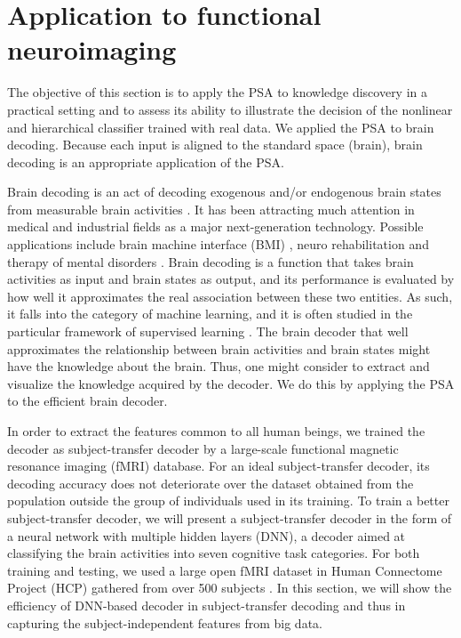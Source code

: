 \section{Application to functional neuroimaging}
\label{sec:application}

The objective of this section is to apply the PSA to knowledge discovery in
a practical setting and to assess its ability to
illustrate the decision of the nonlinear and hierarchical classifier trained with real data.
%
We applied the PSA to brain decoding.
%
Because each input is aligned to the standard space (brain),
brain decoding is an appropriate application of the PSA.

Brain decoding is an act of decoding exogenous and/or endogenous brain states from measurable brain activities \cite{haxby2001distributed,cox2003functional,kamitani2005decoding,shibata2011perceptual,Horikawa2013}.
%
It has been attracting much attention in medical and industrial fields as a major next-generation technology.
%
Possible applications include brain machine interface
(BMI) \cite{laconte2011decoding}, neuro
rehabilitation \cite{sitaram2012acquired} and therapy of mental
disorders \cite{sitaram2007fmri}.
Brain decoding is a function that takes brain activities as input and
brain states as output, and its performance is evaluated by how well it
approximates the real association between these two entities.
%
As such, it falls into the category of machine learning, and it is often
studied in the particular framework of supervised learning \cite{lemm2011introduction}.
%
The brain decoder that well approximates the relationship between brain
activities and brain states might have the knowledge about the brain.
%
Thus, one might consider to extract and visualize the knowledge acquired by the decoder.
%
We do this by applying the PSA to the efficient brain decoder.

In order to extract the features common to all human beings,
we trained the decoder as subject-transfer decoder \cite{fazli2009subject,raizada2012makes,marquand2014bayesian}
by a large-scale functional magnetic resonance imaging (fMRI) database.
%
For an ideal subject-transfer decoder, its decoding accuracy does not
deteriorate over the dataset obtained from the population outside the
group of individuals used in its training.
%
To train a better subject-transfer decoder, we will present a
subject-transfer decoder in the form of a neural network with multiple
hidden layers (DNN), a decoder aimed at classifying the brain activities
into seven cognitive task categories.
%
For both training and testing, we used a large open fMRI dataset in Human
Connectome Project (HCP) gathered from over 500 subjects \cite{van2013wu}.
%
In this section, we will show the efficiency of DNN-based decoder
in subject-transfer decoding and thus in capturing
the subject-independent features from big data.

